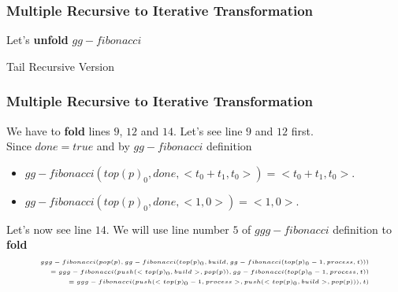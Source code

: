 \documentclass{beamer}
\begin{document}
\begin{frame}
	\frametitle{Multiple Recursive to Iterative Transformation}
	Let's \textbf{unfold} $gg-fibonacci$
	\begin{block}{Tail Recursive Version}
		\tiny
		\begin{algorithmic}[1]
					\State{}
				\Else
						\State{}
					\Else
							\State{}
						\Else
								\State{}
							\Else
								\State{}
							\EndIf
						\EndIf
					\EndIf
				\EndIf
			\EndProcedure
		\end{algorithmic}
	\end{block}
\end{frame}
\begin{frame}
	\frametitle{Multiple Recursive to Iterative Transformation}
	We have to \textbf{fold} lines $9$, $12$ and $14$. Let's see line $9$ and $12$ first.\\
	Since $done = true$ and by $gg-fibonacci$ definition  
	\begin{itemize}
		\item $gg-fibonacci(top(p)_0,done,<t_0+t_1,t_0>) = <t_0+t_1,t_0>$. 
		\item $gg-fibonacci(top(p)_0,done,<1,0>) = <1,0>$. 
	\end{itemize}
	Let's now see line $14$. We will use line number $5$ of $ggg-fibonacci$ definition to \textbf{fold}
	\begin{equation}
		\tiny
		\begin{split}
			ggg-fibonacci(pop(p),gg-fibonacci(top(p)_0,build,gg-fibonacci(top(p)_0-1,process,t))) \\=
			ggg-fibonacci(push(<top(p)_0,build>,pop(p)), gg-fibonacci(top(p)_0-1,process,t)) \\=
			ggg-fibonacci(push(<top(p)_0-1,process>,push(<top(p)_0,build>,pop(p))),t)
		\end{split}
	\end{equation}

\end{frame}
\end{document}
